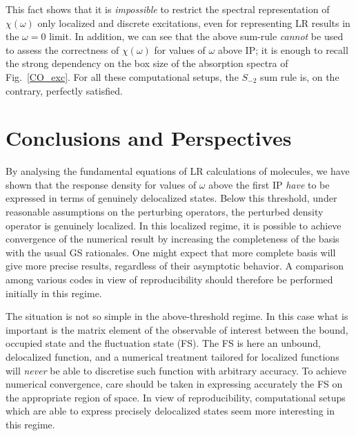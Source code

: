 \documentclass[reprint,aps,prb]{revtex4-1}
\begin{document}
This fact shows that it is \emph{impossible} to restrict the spectral representation
of $\chi(\omega)$ only localized and discrete excitations, even for representing LR results in the $\omega=0$ limit.
In addition, we can see that the above sum-rule \emph{cannot} be used to assess
the correctness of $\chi(\omega)$ for values of $\omega$ above IP; it is enough to recall
the strong dependency on the box size of the absorption spectra of Fig.~\ref{CO_exc}.
For all these computational setups, the $S_{-2}$ sum rule is, on the contrary, perfectly satisfied.

\section{Conclusions and Perspectives}

By analysing the fundamental equations of LR calculations of molecules, we have shown that the response density for values of $\omega$ above the first IP
\emph{have} to be expressed in terms of genuinely delocalized states. %
Below this threshold,
under reasonable assumptions on the perturbing operators,
the perturbed density operator is genuinely localized.
In this localized regime, it is possible to achieve convergence of the numerical result
by increasing the completeness of the basis with the usual GS rationales.
One might expect that more complete basis will give more precise results, regardless of their asymptotic behavior.
A comparison among various codes in view of reproducibility should therefore be performed 
initially in this regime.

The situation is not so simple in the above-threshold regime.
In this case what is important is the matrix element of the observable of interest
between the bound, occupied state and the fluctuation state (FS). 
The FS is here an unbound, delocalized function, and a numerical treatment tailored for localized functions will \emph{never} be able to discretise such function with arbitrary accuracy.  
To achieve numerical convergence, care should be taken in expressing accurately the FS on the
appropriate region of space. In view of reproducibility, computational setups which are able to express precisely
delocalized states seem more interesting in this regime.
\end{document}
